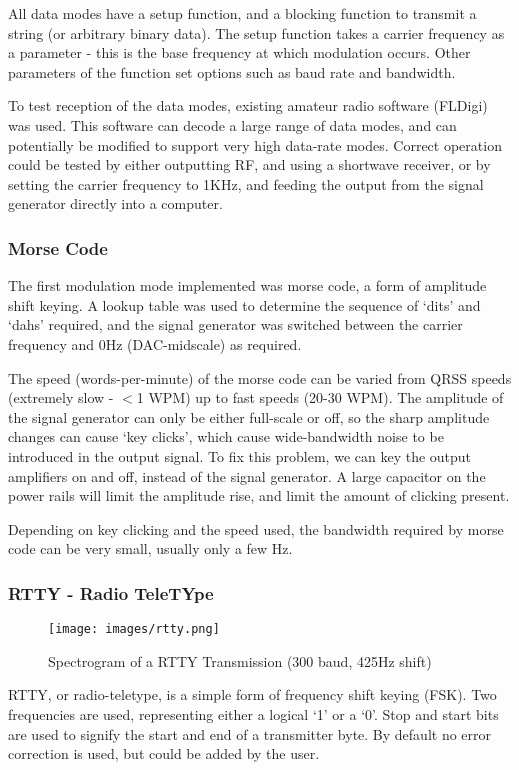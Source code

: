 \documentclass[a4paper,12pt]{article}
\begin{document}
All data modes have a setup function, and a blocking function to transmit a string (or arbitrary binary data). The setup function takes a carrier frequency as a parameter - this is the base frequency at which modulation occurs. Other parameters of the function set options such as baud rate and bandwidth.

To test reception of the data modes, existing amateur radio software (FLDigi) was used. This software can decode a large range of data modes, and can potentially be modified to support very high data-rate modes. Correct operation could be tested by either outputting RF, and using a shortwave receiver, or by setting the carrier frequency to 1KHz, and feeding the output from the signal generator directly into a computer.

\subsubsection*{Morse Code}
The first modulation mode implemented was morse code, a form of amplitude shift keying. A lookup table was used to determine the sequence of `dits' and `dahs' required, and the signal generator was switched between the carrier frequency and 0Hz (DAC-midscale) as required.

The speed (words-per-minute) of the morse code can be varied from QRSS speeds (extremely slow - $<$1 WPM) up to fast speeds (20-30 WPM). The amplitude of the signal generator can only be either full-scale or off, so the sharp amplitude changes can cause `key clicks', which cause wide-bandwidth noise to be introduced in the output signal. To fix this problem, we can key the output amplifiers on and off, instead of the signal generator. A large capacitor on the power rails will limit the amplitude rise, and limit the amount of clicking present.

Depending on key clicking and the speed used, the bandwidth required by morse code can be very small, usually only a few Hz.

\subsubsection*{RTTY - Radio TeleTYpe}
\begin{figure}[h]
  \begin{center}
    \texttt{[image: images/rtty.png]}
  \end{center}
  \caption{Spectrogram of a RTTY Transmission (300 baud, 425Hz shift)}
  \label{fig:rtty}
\end{figure}
RTTY, or radio-teletype, is a simple form of frequency shift keying (FSK). Two frequencies are used, representing either a logical `1' or a `0'. Stop and start bits are used to signify the start and end of a transmitter byte. By default no error correction is used, but could be added by the user.
\end{document}
